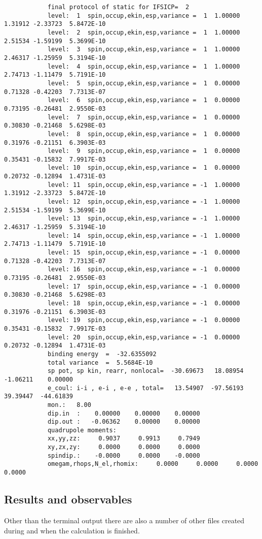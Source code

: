 \documentclass[11pt,a4paper]{article}
\begin{document}
		\begin{verbatim}
			final protocol of static for IFSICP=  2
			level:  1  spin,occup,ekin,esp,variance =  1  1.00000  1.31912 -2.33723  5.8472E-10
			level:  2  spin,occup,ekin,esp,variance =  1  1.00000  2.51534 -1.59199  5.3699E-10
			level:  3  spin,occup,ekin,esp,variance =  1  1.00000  2.46317 -1.25959  5.3194E-10
			level:  4  spin,occup,ekin,esp,variance =  1  1.00000  2.74713 -1.11479  5.7191E-10
			level:  5  spin,occup,ekin,esp,variance =  1  0.00000  0.71328 -0.42203  7.7313E-07
			level:  6  spin,occup,ekin,esp,variance =  1  0.00000  0.73195 -0.26481  2.9550E-03
			level:  7  spin,occup,ekin,esp,variance =  1  0.00000  0.30830 -0.21468  5.6298E-03
			level:  8  spin,occup,ekin,esp,variance =  1  0.00000  0.31976 -0.21151  6.3903E-03
			level:  9  spin,occup,ekin,esp,variance =  1  0.00000  0.35431 -0.15832  7.9917E-03
			level: 10  spin,occup,ekin,esp,variance =  1  0.00000  0.20732 -0.12894  1.4731E-03
			level: 11  spin,occup,ekin,esp,variance = -1  1.00000  1.31912 -2.33723  5.8472E-10
			level: 12  spin,occup,ekin,esp,variance = -1  1.00000  2.51534 -1.59199  5.3699E-10
			level: 13  spin,occup,ekin,esp,variance = -1  1.00000  2.46317 -1.25959  5.3194E-10
			level: 14  spin,occup,ekin,esp,variance = -1  1.00000  2.74713 -1.11479  5.7191E-10
			level: 15  spin,occup,ekin,esp,variance = -1  0.00000  0.71328 -0.42203  7.7313E-07
			level: 16  spin,occup,ekin,esp,variance = -1  0.00000  0.73195 -0.26481  2.9550E-03
			level: 17  spin,occup,ekin,esp,variance = -1  0.00000  0.30830 -0.21468  5.6298E-03
			level: 18  spin,occup,ekin,esp,variance = -1  0.00000  0.31976 -0.21151  6.3903E-03
			level: 19  spin,occup,ekin,esp,variance = -1  0.00000  0.35431 -0.15832  7.9917E-03
			level: 20  spin,occup,ekin,esp,variance = -1  0.00000  0.20732 -0.12894  1.4731E-03
			binding energy  =  -32.6355092
			total variance  =  5.5684E-10
			sp pot, sp kin, rearr, nonlocal=  -30.69673   18.08954   -1.06211    0.00000
			e_coul: i-i , e-i , e-e , total=   13.54907  -97.56193   39.39447  -44.61839
			mon.:   8.00
			dip.in  :    0.00000    0.00000    0.00000
			dip.out :   -0.06362    0.00000    0.00000
			quadrupole moments:
			xx,yy,zz:     0.9037     0.9913     0.7949
			xy,zx,zy:     0.0000     0.0000     0.0000
			spindip.:    -0.0000     0.0000    -0.0000
			omegam,rhops,N_el,rhomix:     0.0000     0.0000     0.0000     0.0000
		\end{verbatim}
		
		\subsection{Results and observables}
			Other than the terminal output there are also a number of other files created during and when the calculation is finished.
\end{document}
